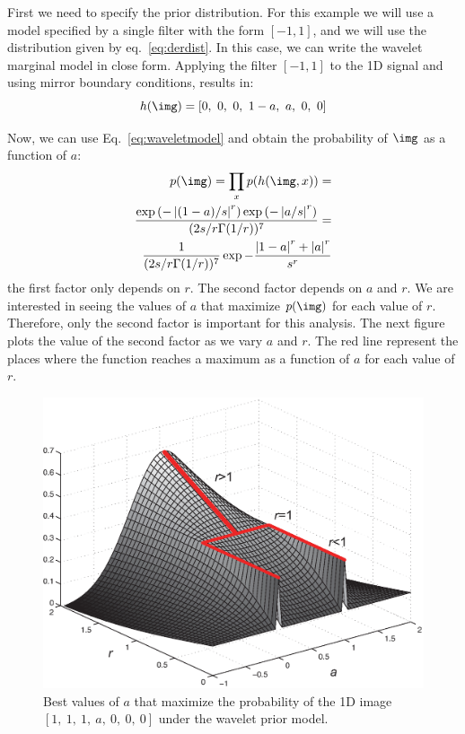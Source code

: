 First we need to specify the prior distribution. For this example we will use a model specified by a single filter with the form $[-1, 1]$, and we will use the distribution given by eq.~\ref{eq:derdist}. In this case, we can write the wavelet marginal model in close form. Applying the filter $\left[-1, 1\right]$ to the 1D signal and using mirror boundary conditions, results in:
\begin{equation}
h(\img) = \left[0,~0,~ 0,~ 1-a,~ a,~ 0,~ 0\right]
\end{equation}

Now, we can use Eq.~\ref{eq:waveletmodel} and obtain the probability of $\img$ as a function of $a$:
\begin{eqnarray}
p(\img) = \prod_{x} p(h(\img, x)) = \\
\frac {\exp \left(- \left| (1-a)/s  \right|^r \right) \exp \left(- \left| a/s  \right|^r \right)}{(2s/r \Gamma(1/r))^7} = \\
\frac{1}{(2s/r \Gamma(1/r))^7} \exp - \frac{\left| 1-a \right|^r+\left| a \right|^r} {s^r}  
\end{eqnarray}
the first factor only depends on $r$. The second factor depends on $a$ and $r$. We are interested in seeing the values of $a$ that maximize $p(\img)$ for each value of $r$. Therefore, only the second factor is important for this analysis. The next figure plots the value of the second factor as we vary $a$ and $r$. The red line represent the places where the function reaches a maximum as a function of $a$ for each value of $r$.

\begin{figure}[htpb]
\centerline{
\includegraphics[width=.6\linewidth]{figures/statistical_image_models/best_a_s1.eps}
} 
\caption{Best values of $a$ that maximize the probability of the 1D image $\left[1,~ 1,~ 1,~ a,~ 0,~ 0,~ 0\right]$ under the wavelet prior model.} 
\label{fig:best_a}
\end{figure}

